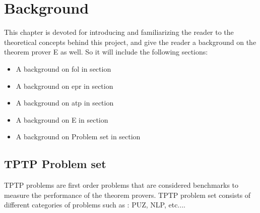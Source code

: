 \chapter{Background}\label{chap:background}

This chapter is devoted for introducing and familiarizing the reader to the theoretical concepts behind this project, and give the reader a background on the theorem prover E as well. So it will include the following sections:
	\begin{itemize}
		\item A background on \ac{fol} in section %
		\item A background on \ac{epr} in section %
		\item A background on \ac{atp} in section %
		\item A background on E in section %
		\item A background on Problem set in section %
	\end{itemize}



\section{TPTP Problem set}\label{sec:c2s2}
TPTP problems are first order problems that are considered benchmarks to measure the performance of the theorem provers. TPTP problem set consists of different categories of problems such as : PUZ, NLP, etc....



